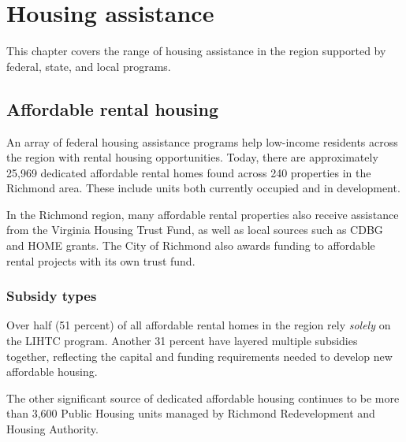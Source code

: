 \documentclass[
  letterpaper,
  DIV=11,
  numbers=noendperiod]{scrreprt}
\begin{document}
\hypertarget{part-2-3}{%
\chapter{Housing assistance}\label{part-2-3}}

This chapter covers the range of housing assistance in the region
supported by federal, state, and local programs.

\hypertarget{affordable-rental-housing}{%
\section{Affordable rental housing}\label{affordable-rental-housing}}

An array of federal housing assistance programs help low-income
residents across the region with rental housing opportunities. Today,
there are approximately 25,969 dedicated affordable rental homes found
across 240 properties in the Richmond area. These include units both
currently occupied and in development.

\begin{tcolorbox}[enhanced jigsaw, colback=white, colbacktitle=quarto-callout-tip-color!10!white, bottomrule=.15mm, opacitybacktitle=0.6, colframe=quarto-callout-tip-color-frame, breakable, opacityback=0, bottomtitle=1mm, titlerule=0mm, coltitle=black, leftrule=.75mm, left=2mm, title=\textcolor{quarto-callout-tip-color}{\faLightbulb}\hspace{0.5em}{Tip}, toptitle=1mm, arc=.35mm, rightrule=.15mm, toprule=.15mm]
In the Richmond region, many affordable rental properties also receive
assistance from the Virginia Housing Trust Fund, as well as local
sources such as CDBG and HOME grants. The City of Richmond also awards
funding to affordable rental projects with its own trust fund.
\end{tcolorbox}

\hypertarget{subsidy-types}{%
\subsection{Subsidy types}\label{subsidy-types}}

Over half (51 percent) of all affordable rental homes in the region rely
\emph{solely} on the LIHTC program. Another 31 percent have layered
multiple subsidies together, reflecting the capital and funding
requirements needed to develop new affordable housing.

The other significant source of dedicated affordable housing continues
to be more than 3,600 Public Housing units managed by Richmond
Redevelopment and Housing Authority.
\end{document}
